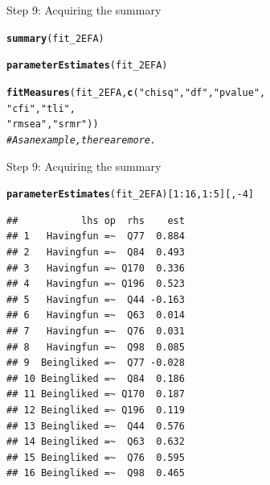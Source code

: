 \documentclass[10pt]{beamer}\usepackage[]{graphicx}\usepackage[]{xcolor}
\makeatletter
\newcommand{\hlnum}[1]{\textcolor[rgb]{0.686,0.059,0.569}{#1}}%
\newcommand{\hlstr}[1]{\textcolor[rgb]{0.192,0.494,0.8}{#1}}%
\newcommand{\hlcom}[1]{\textcolor[rgb]{0.678,0.584,0.686}{\textit{#1}}}%
\newcommand{\hlopt}[1]{\textcolor[rgb]{0,0,0}{#1}}%
\newcommand{\hlstd}[1]{\textcolor[rgb]{0.345,0.345,0.345}{#1}}%
\newcommand{\hlkwd}[1]{\textcolor[rgb]{0.737,0.353,0.396}{\textbf{#1}}}%
\newenvironment{kframe}{%
 \def\at@end@of@kframe{}%
 \ifinner\ifhmode%
  \def\at@end@of@kframe{\end{minipage}}%
  \begin{minipage}{\columnwidth}%
 \fi\fi%
 \def\FrameCommand##1{\hskip\@totalleftmargin \hskip-\fboxsep
 \colorbox{shadecolor}{##1}\hskip-\fboxsep
     \hskip-\linewidth \hskip-\@totalleftmargin \hskip\columnwidth}%
 \MakeFramed {\advance\hsize-\width
   \@totalleftmargin\z@ \linewidth\hsize
   \@setminipage}}%
 {\par\unskip\endMakeFramed%
 \at@end@of@kframe}
\newenvironment{knitrout}{}{} %
\makeatother
\begin{document}
\begin{frame}[fragile]{Step 9: Acquiring the summary}

\begin{knitrout}
\color{fgcolor}\begin{kframe}
\begin{alltt}
\hlkwd{summary}\hlstd{(fit_2EFA)}

\hlkwd{parameterEstimates}\hlstd{(fit_2EFA)}

\hlkwd{fitMeasures}\hlstd{(fit_2EFA,} \hlkwd{c}\hlstd{(}\hlstr{"chisq"}\hlstd{,} \hlstr{"df"}\hlstd{,} \hlstr{"pvalue"}\hlstd{,}
                        \hlstr{"cfi"}\hlstd{,} \hlstr{"tli"}\hlstd{,}
                        \hlstr{"rmsea"}\hlstd{,}\hlstr{"srmr"}\hlstd{))}
\hlcom{# As an example, there are more.}
\end{alltt}
\end{kframe}
\end{knitrout}

\end{frame}
%
\begin{frame}[fragile]{Step 9: Acquiring the summary}

\begin{knitrout}
\color{fgcolor}\begin{kframe}
\begin{alltt}
\hlkwd{parameterEstimates}\hlstd{(fit_2EFA)[}\hlnum{1}\hlopt{:}\hlnum{16}\hlstd{,}\hlnum{1}\hlopt{:}\hlnum{5}\hlstd{][,}\hlopt{-}\hlnum{4}\hlstd{]}
\end{alltt}
\begin{verbatim}
##           lhs op  rhs    est
## 1   Havingfun =~  Q77  0.884
## 2   Havingfun =~  Q84  0.493
## 3   Havingfun =~ Q170  0.336
## 4   Havingfun =~ Q196  0.523
## 5   Havingfun =~  Q44 -0.163
## 6   Havingfun =~  Q63  0.014
## 7   Havingfun =~  Q76  0.031
## 8   Havingfun =~  Q98  0.085
## 9  Beingliked =~  Q77 -0.028
## 10 Beingliked =~  Q84  0.186
## 11 Beingliked =~ Q170  0.187
## 12 Beingliked =~ Q196  0.119
## 13 Beingliked =~  Q44  0.576
## 14 Beingliked =~  Q63  0.632
## 15 Beingliked =~  Q76  0.595
## 16 Beingliked =~  Q98  0.465
\end{verbatim}
\end{kframe}
\end{knitrout}

\end{frame}
%
\end{document}
